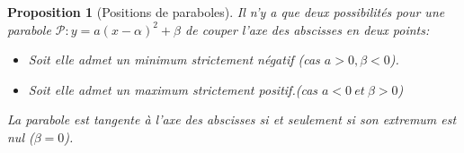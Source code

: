\documentclass{beamer}
\newtheorem{proposition}{Proposition}
\begin{document}
    \begin{frame}
      
    \begin{proposition}[Positions de paraboles]
    Il n'y a que deux possibilités pour une parabole $\mathcal{P}:y=a(x-\alpha)^2+\beta$ 
    de couper l'axe des abscisses en deux points:
   \begin{itemize}
    \item Soit elle admet un minimum strictement négatif (cas $a>0, \beta <0$).
    \item Soit elle admet un maximum strictement positif.(cas $a<0\ et\ \beta >0$)
   \end{itemize}
   
   La parabole est tangente à l'axe des abscisses si et seulement si son extremum est 
   nul ($\beta=0$).

  \end{proposition}
   
  \end{frame}

	
     
      

      
      
      
      
    
    
   

  
\end{document}
